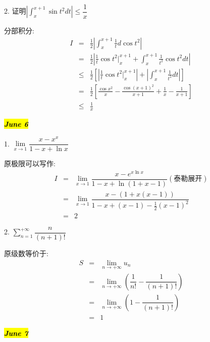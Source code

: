 2. 证明$\left| \int_{x}^{x+1}\sin t^2dt\right| \leq \dfrac{1}{x}$
\begin{solution}
	
	分部积分: 
	\begin{eqnarray*}
		I&=&\frac{1}{2}\left| \int_{x}^{x+1}\frac{1}{t}d\cos t^2\right|\\
		&=&\frac{1}{2}\left| \frac{1}{t}\cos t^2|_{x}^{x+1}+ \int_{x}^{x+1}\frac{1}{t^2}\cos t^2dt\right|\\
		&\leq&\frac{1}{2}[\left| \frac{1}{t}\cos t^2|_{x}^{x+1}\right|+\left|  \int_{x}^{x+1}\frac{1}{t^2}dt\right|]\\
		&=&\frac{1}{2}[\frac{\cos x^2}{x}-\frac{\cos(x+1)^2}{x+1}+\frac{1}{x}-\frac{1}{x+1}]\\
		&\leq&\frac{1}{x}
	\end{eqnarray*}
\end{solution}

\hl{\textbf{\textit{June 6}}}

1. $\lim\limits_{x\rightarrow 1}\dfrac{x-x^{x}}{1-x+\ln x}$
\begin{solution}
	
	原极限可以写作: 
	\begin{eqnarray*}
		I&=&\lim\limits_{x\rightarrow 1}\dfrac{x-e^{x\ln x}}{1-x+\ln(1+x-1)}(\text{泰勒展开})\\
		&=&\lim\limits_{x\rightarrow 1}\dfrac{x-(1+x(x-1))}{1-x+(x-1)-\frac{1}{2}(x-1)^2}\\
		&=&2
	\end{eqnarray*}
\end{solution}

2. $\sum\limits_{n=1}^{+\infty}\dfrac{n}{(n+1)!}$
\begin{solution}
	
	原级数等价于: 
	\begin{eqnarray*}
		S&=&\lim\limits_{n\rightarrow+\infty}u_{n}\\
		&=&\lim\limits_{n\rightarrow+\infty}(\dfrac{1}{n!}-\dfrac{1}{(n+1)!})\\
		&=&\lim\limits_{n\rightarrow+\infty}(1-\dfrac{1}{(n+1)!})\\
		&=&1	
	\end{eqnarray*}
\end{solution}

\hl{\textbf{\textit{June 7}}}

